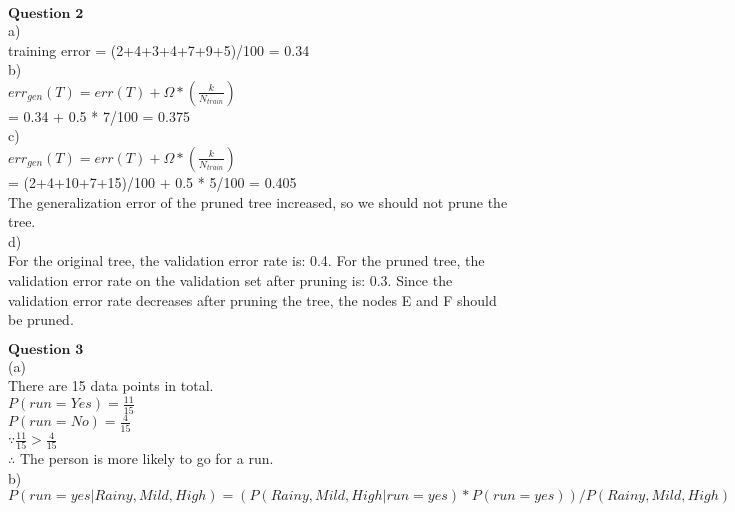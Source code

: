\documentclass[12pt]{article}
\begin{document}
\newpage

$\textbf{Question 2}$\\

a)\\

training error = (2+4+3+4+7+9+5)/100 = 0.34\\

b)\\

$err_{gen}(T)= err(T) + \Omega * (\frac{k}{N_{train}})$\\

= 0.34 + 0.5 * 7/100 = 0.375\\

c)\\

$err_{gen}(T)= err(T) + \Omega * (\frac{k}{N_{train}})$\\

= (2+4+10+7+15)/100 + 0.5 * 5/100 = 0.405\\

The generalization error of the pruned tree increased, so we should not prune the tree.\\

d)\\

For the original tree, the validation error rate is: 0.4. For the pruned tree, the validation error rate on the validation set after pruning is: 0.3. Since the validation error rate decreases after pruning the tree, the nodes E and F should be pruned.\\

\newpage

$\textbf{Question 3}$\\

(a)\\

There are 15 data points in total.\\

$P(run = Yes) = \frac{11}{15}$\\

$P(run = No) = \frac{4}{15}$\\

$\because \frac{11}{15} >\frac{4}{15}$\\

$\therefore$ The person is more likely to go for a run.\\

b)\\

$P(run=yes|Rainy,Mild,High) = (P(Rainy,Mild,High|run=yes)*P(run=yes))/P(Rainy,Mild,High)$\\
\end{document}

